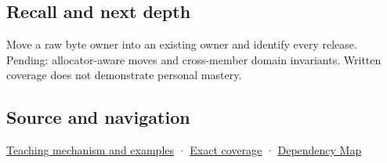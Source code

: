 \subsection{Recall and next depth}\label{appendix-5636651017c2-recall-and-next-depth}

Move a raw byte owner into an existing owner and identify every release. Pending: allocator-aware moves and cross-member domain invariants. Written coverage does not demonstrate personal mastery.

\subsection{Source and navigation}\label{appendix-5636651017c2-source-and-navigation}

\hyperref[01-foundations-i-ch003-a-move-transfers-responsibility-while-the-source-survives]{Teaching mechanism and examples} · \hyperref[appendix-fd090d982a15-m009---parts-127-147]{Exact coverage} · \hyperref[appendix-4ad47bdd269a]{Dependency Map}
